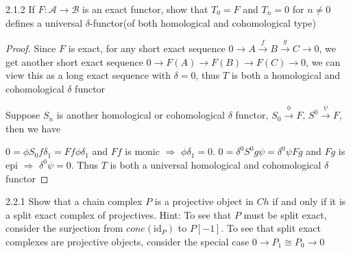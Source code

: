 \documentclass[../main.tex]{subfiles}
\begin{document}
\begin{customexercise}{2.1.2}
If $F:\mathscr A\to\mathscr B$ is an exact functor, show that $T_0=F$ and $T_n=0$ for $n\neq0$ defines a universal $\delta$-functor(of both homological and cohomological type)
\end{customexercise}

\begin{proof}
Since $F$ is exact, for any short exact sequence $0\to A\xrightarrow{f} B\xrightarrow{g} C\to0$, we get another short exact sequence $0\to F(A)\to F(B)\to F(C)\to0$, we can view this as a long exact sequence with $\delta=0$, thus $T$ is both a homological and cohomological $\delta$ functor \par
Suppose $S_n$ is another homological or cohomological $\delta$ functor, $S_0\xrightarrow{\phi}F$, $S^0\xrightarrow{\psi}F$, then we have
\begin{center}
\end{center}
$0=\phi S_0f\delta_1=Ff\phi\delta_1$ and $Ff$ is monic $\Rightarrow$ $\phi\delta_1=0$. $0=\delta^0S^0g\psi=\delta^0\psi Fg$ and $Fg$ is epi $\Rightarrow$ $\delta^0\psi=0$. Thus $T$ is both a universal homological and cohomological $\delta$ functor
\end{proof}

\begin{customexercise}{2.2.1}
Show that a chain complex $P$ is a projective object in $Ch$ if and only if it is a split exact complex of projectives. Hint: To see that $P$ must be split exact, consider the surjection from $cone(\mathrm{id}_P)$ to $P[-1]$. To see that split exact complexes are projective objects, consider the special case $0\to P_1\cong P_0\to0$
\end{customexercise}
\end{document}

